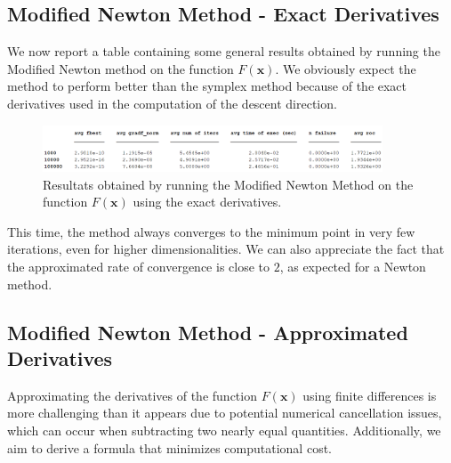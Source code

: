 \medskip
\subsection*{Modified Newton Method - Exact Derivatives}
We now report a table containing some general results obtained by running the Modified Newton method on the function $F(\mathbf{x})$.
We obviously expect the method to perform better than the symplex method because of the exact derivatives used in the computation of the descent direction.

\begin{figure}[htbp]
    \centering
    \includegraphics[width = 0.9\textwidth]{img/pb76_table_MN.png}
    \caption{Resultats obtained by running the Modified Newton Method on the function $F(\mathbf{x})$ using the exact derivatives.}
\end{figure}

This time, the method always converges to the minimum point in very few iterations, even for higher dimensionalities. 
We can also appreciate the fact that the approximated rate of convergence is close to $2$, as expected for a Newton method.


\medskip
\subsection*{Modified Newton Method - Approximated Derivatives}
Approximating the derivatives of the function $F(\mathbf{x})$ using finite differences is more challenging than it appears due to potential numerical cancellation issues, which can occur when subtracting two nearly equal quantities. Additionally, we aim to derive a formula that minimizes computational cost.

